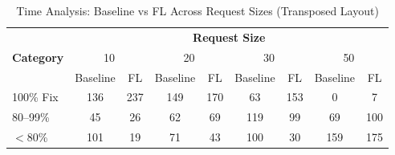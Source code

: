 \begin{table*}[t]
\centering
\caption{Time Analysis: Baseline vs FL Across Request Sizes (Transposed Layout)}
\label{tab:time_transposed}
\footnotesize
\setlength{\tabcolsep}{5pt}
\begin{tabular}{lcccccccc}
\toprule
& \multicolumn{8}{c}{\textbf{Request Size}} \\
\cmidrule(lr){2-9}
\textbf{Category} & \multicolumn{2}{c}{10} & \multicolumn{2}{c}{20} & \multicolumn{2}{c}{30} & \multicolumn{2}{c}{50} \\
\cmidrule(lr){2-9}
  & Baseline & FL & Baseline & FL & Baseline & FL & Baseline & FL \\
\midrule
100\% Fix & 136 & 237 & 149 & 170 & 63 & 153 & 0 & 7 \\
80--99\% & 45 & 26 & 62 & 69 & 119 & 99 & 69 & 100 \\
$<$80\% & 101 & 19 & 71 & 43 & 100 & 30 & 159 & 175 \\
\bottomrule
\end{tabular}
\end{table*}
